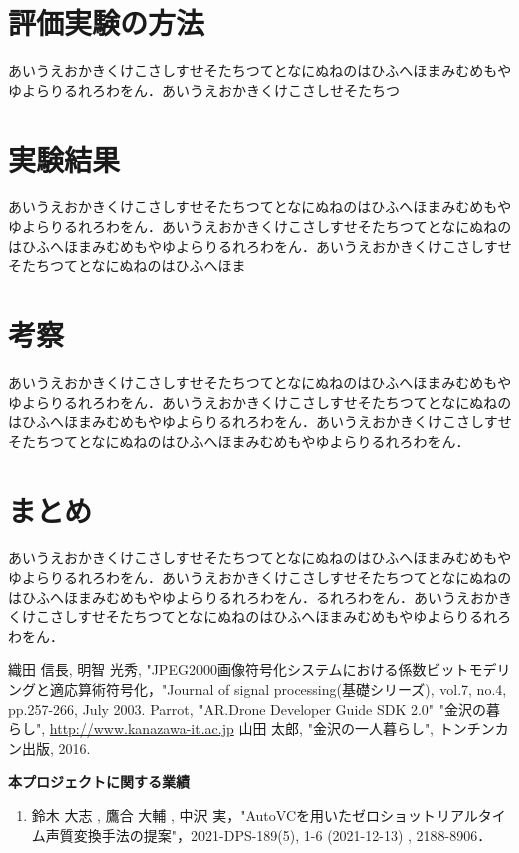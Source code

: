 \begin{multicols*}{2}
	\section{評価実験の方法}
	あいうえおかきくけこさしすせそたちつてとなにぬねのはひふへほまみむめもやゆよらりるれろわをん．あいうえおかきくけこさしせそたちつ

	
		\section{実験結果}
	あいうえおかきくけこさしすせそたちつてとなにぬねのはひふへほまみむめもやゆよらりるれろわをん．あいうえおかきくけこさしすせそたちつてとなにぬねのはひふへほまみむめもやゆよらりるれろわをん．あいうえおかきくけこさしすせそたちつてとなにぬねのはひふへほま	
	\section{考察}
		あいうえおかきくけこさしすせそたちつてとなにぬねのはひふへほまみむめもやゆよらりるれろわをん．あいうえおかきくけこさしすせそたちつてとなにぬねのはひふへほまみむめもやゆよらりるれろわをん．あいうえおかきくけこさしすせそたちつてとなにぬねのはひふへほまみむめもやゆよらりるれろわをん．
	\section{まとめ}
		あいうえおかきくけこさしすせそたちつてとなにぬねのはひふへほまみむめもやゆよらりるれろわをん．あいうえおかきくけこさしすせそたちつてとなにぬねのはひふへほまみむめもやゆよらりるれろわをん．るれろわをん．あいうえおかきくけこさしすせそたちつてとなにぬねのはひふへほまみむめもやゆよらりるれろわをん．

\begin{thebibliography}{99}
 織田 信長, 明智 光秀, "JPEG2000画像符号化システムにおける係数ビットモデリングと適応算術符号化，"Journal of signal processing(基礎シリーズ), vol.7, no.4, pp.257-266, July 2003.
Parrot, "AR.Drone Developer Guide SDK 2.0"
 "金沢の暮らし", \url{http://www.kanazawa-it.ac.jp}
 山田 太郎, "金沢の一人暮らし", トンチンカン出版, 2016.
\end{thebibliography}

\noindent\textbf{本プロジェクトに関する業績} %
\begin{enumerate}[label=\arabic*),leftmargin=2.25zw]
\item 鈴木 大志 , 鷹合 大輔 , 中沢 実，"AutoVCを用いたゼロショットリアルタイム声質変換手法の提案"，2021-DPS-189(5), 1-6 (2021-12-13) , 2188-8906．
\end{enumerate}

\end{multicols*} 


